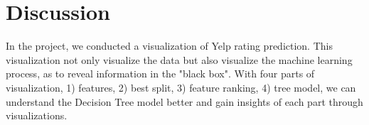 \section{Discussion}
\label{sec:discussion} 

In the project, we conducted a visualization of Yelp rating prediction. This visualization not only visualize the data but also visualize the machine learning process, as to reveal information in the "black box". With four parts of visualization, 1) features, 2) best split, 3) feature ranking, 4) tree model, we can understand the Decision Tree model better and gain insights of each part through visualizations. 